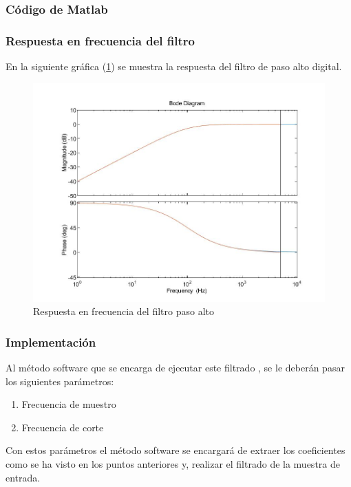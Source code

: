 \documentclass[titlepage]{article}
\begin{document}
\subsubsection{Código de Matlab}


\subsubsection{Respuesta en frecuencia del filtro}
En la siguiente gráfica (\ref{fig:filtro_paso_alto_primer_orden}) se muestra la respuesta del filtro de paso alto digital.
\begin{figure}[H]
  \centering
	\includegraphics[scale=0.4]{filtro_paso_alto_primer_orden}
  \caption{Respuesta en frecuencia del filtro paso alto}
  \label{fig:filtro_paso_alto_primer_orden}
\end{figure}
\subsubsection{Implementación}
Al método software que se encarga de ejecutar este filtrado , se le deberán pasar los siguientes parámetros:
\begin{enumerate}
\item Frecuencia de muestro 
\item Frecuencia de corte
\end{enumerate}
Con estos parámetros el método software se encargará de extraer los coeficientes como se ha visto en los puntos anteriores y, realizar el filtrado de la muestra de entrada.
\end{document}
